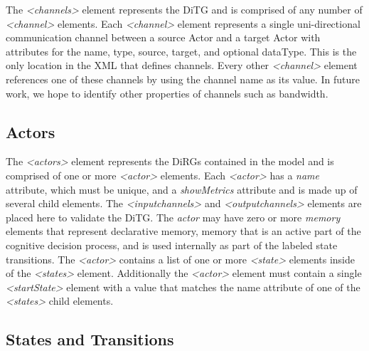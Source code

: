The {\em \textless channels\textgreater} element represents the DiTG and is comprised of any number of {\em \textless channel\textgreater} elements.  Each {\em \textless channel\textgreater} element represents a single uni-directional communication channel between a source Actor and a target Actor with attributes for the name, type, source, target, and optional dataType.  This is the only location in the XML that defines channels.  Every other {\em \textless channel\textgreater} element references one of these channels by using the channel name as its value.  In future work, we hope to identify other properties of channels such as bandwidth.

\begin{spacing}{.5}

\end{spacing}

\subsection{Actors}

The {\em \textless actors\textgreater} element represents the DiRGs contained in the model and is comprised of one or more {\em \textless actor\textgreater} elements.  Each {\em \textless actor\textgreater} has a {\em name} attribute, which must be unique, and a {\em showMetrics} attribute and is made up of several child elements.  The {\em \textless inputchannels\textgreater} and {\em \textless outputchannels\textgreater} elements are placed here to validate the DiTG.  The {\em actor} may have zero or more {\em memory} elements that represent declarative memory, memory that is an active part of the cognitive decision process, and is used internally as part of the labeled state transitions.  The {\em \textless actor\textgreater} contains a list of one or more {\em \textless state\textgreater} elements inside of the {\em \textless states\textgreater} element.  Additionally the {\em \textless actor\textgreater} element must contain a single {\em \textless startState\textgreater} element with a value that matches the name attribute of one of the {\em \textless states\textgreater} child elements.

\begin{spacing}{.5}

\end{spacing}


\subsection{States and Transitions}

